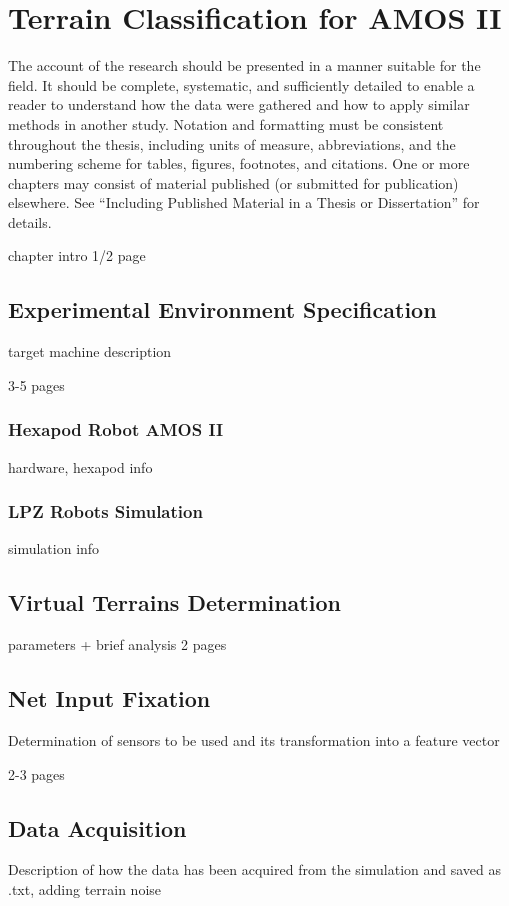 \chapter{Terrain Classification for AMOS II}
\label{chapter:05:terrain_classification}

The account of the research should be presented in a manner suitable for the field. It should be complete, systematic, and sufficiently detailed to enable a reader to understand how the data were gathered and how to apply similar methods in another study. Notation and formatting must be consistent throughout the thesis, including units of measure, abbreviations, and the numbering scheme for tables, figures, footnotes, and citations. One or more chapters may consist of material published (or submitted for publication) elsewhere. See “Including Published Material in a Thesis or Dissertation” for details.

chapter intro
1/2 page

\section{Experimental Environment Specification}
target machine description

3-5 pages

\subsection{Hexapod Robot AMOS II}
hardware, hexapod info

\subsection{LPZ Robots Simulation}
simulation info

\section{Virtual Terrains Determination}
parameters + brief analysis
2 pages

\section{Net Input Fixation}
Determination of sensors to be used and its transformation into a feature vector

2-3 pages

\section{Data Acquisition}
Description of how the data has been acquired from the simulation and saved as .txt, adding terrain noise

